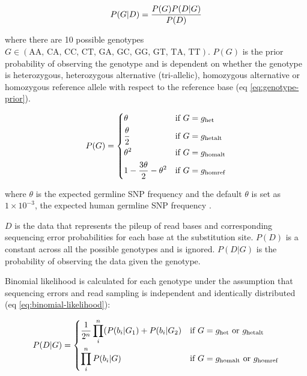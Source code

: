 \begin{equation} \label{eq:bayes-rule}
P(G|D) = \frac{P(G)P(D|G)}{P(D)} \smallskip
\end{equation}

where there are 10 possible genotypes $G \in (\text{AA, CA, CC, CT, GA, GC, GG, GT, TA, TT})$. $P(G)$ is the prior probability of observing the genotype and is dependent on whether the genotype is heterozygous, heterozygous alternative (tri-allelic), homozygous alternative or homozygous reference allele with respect to the reference base (eq \ref{eq:genotype-prior}).  

\begin{equation} \label{eq:genotype-prior}
 P(G)= 
 	\begin{dcases}
    	\theta & \text{if } G = g_{\text{het}} \\
	    \frac{\theta}{2} & \text{if } G = g_{\text{hetalt}} \\
		\theta^{2} & \text{if } G = g_{\text{homalt}} \\
		1 - \frac{3\theta}{2} - \theta^{2} & \text{if } G = g_{\text{homref}} \\
	\end{dcases} \smallskip
\end{equation}

where $\theta$ is the expected germline SNP frequency and the default $\theta$ is set as $1\times10^{-3}$, the expected human germline SNP frequency \cite{1000_Genomes_Project_Consortium2012-rj}. 

$D$ is the data that represents the pileup of read bases and corresponding sequencing error probabilities for each base at the substitution site. $P(D)$ is a constant across all the possible genotypes and is ignored. $P(D|G)$ is the probability of observing the data given the genotype. 

Binomial likelihood is calculated for each genotype under the assumption that sequencing errors and read sampling is independent and identically distributed (eq \ref{eq:binomial-likelihood}):

\begin{equation} \label{eq:binomial-likelihood}
P(D|G) =  
	\begin{dcases}
    	\frac{1}{2^n}\prod_{i}^{n} (P(b_{i}|G_1) + P(b_{i}|G_2) & \text{if } G = g_{\text{het}} \text{ or } g_{\text{hetalt}} \\
	    \prod_{i}^{n} P(b_{i}|G) & \text{if } G = g_{\text{homalt}} \text{ or } g_{\text{homref}} \\
	\end{dcases}
\end{equation}

